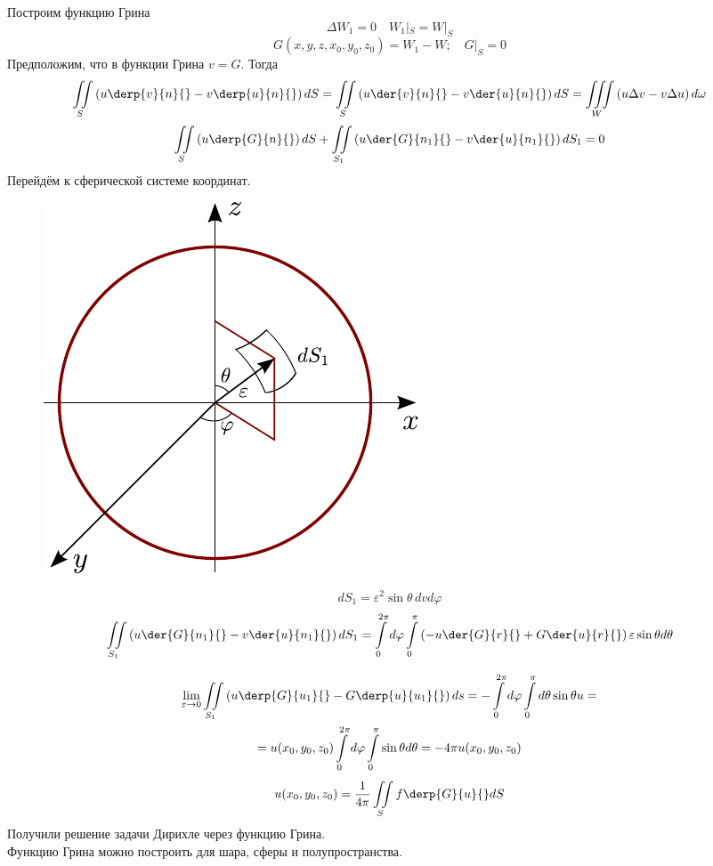 		Построим функцию Грина\\
\[
	\Delta W_1 = 0 \quad W_1 |_S = W |_S
\]
\[
	G (x, y, z, x_0, y_0, z_0) = W_1 - W; \quad G|_S = 0
\]
		Предположим, что в функции Грина $v = G$. Тогда 
\[
	\iint\limits_{S} \left(u \derp{v}{n}{} - v \derp{u}{n}{}\right) dS = \iint\limits_S \left(u \der{v}{n}{} - v \der{u}{n}{}\right) dS = \iiint\limits_{W} \left(u \Delta v - v \Delta u \right) d \omega
\] %
\[
	\iint\limits_{S} \left(u \derp{G}{n}{} \right) dS + \iint\limits_{S_1} \left(u \der{G}{n_1}{} - v \der{u}{n_1}{}\right) dS_1 = 0 
\]
		Перейдём к сферической системе координат.\\
\begin{figure}[h!]
	\centering
	\includegraphics{figGreenIllust.pdf}
\end{figure}
\[
	dS_1 = \varepsilon^2 \sin \theta \, dv d \varphi
\]
\[
	\iint\limits_{S_1} \left(u \der{G}{n_1}{} - v \der{u}{n_1}{}\right) dS_1 = \int\limits_0^{2 \pi} d\varphi \int\limits_0^{\pi} \left(- u \der{G}{r}{} + G \der{u}{r}{} \right) \varepsilon \sin \theta d \theta
\]

\begin{multline*}
	\lim\limits_{\varepsilon \to 0} \iint\limits_{S_1} \left( u \derp{G}{u_1}{} - G \derp{u}{u_1}{} \right) ds = - \int\limits_{0}^{2 \pi} d \varphi \int\limits_{0}^{\pi} d\theta \sin \theta u = \\ = u (x_0, y_0, z_0)\int\limits_0^{2 \pi} d \varphi \int\limits_{0}^{\pi} \sin \theta d \theta = - 4 \pi u (x_0, y_0, z_0) 
\end{multline*}
\[
	u(x_0, y_0, z_0) = \frac{1}{4 \pi} \iint\limits_S f \derp{G}{u}{} dS
\]
Получили решение задачи Дирихле через функцию Грина.\\
Функцию Грина можно построить для шара, сферы и полупространства.\\